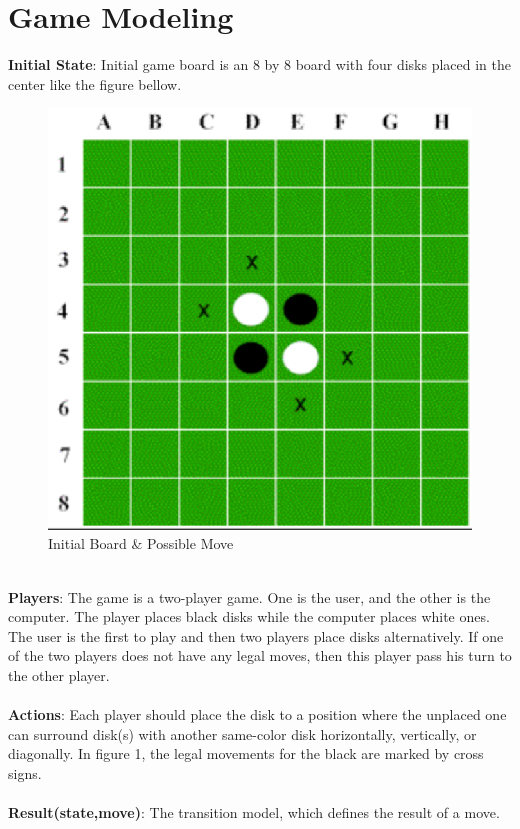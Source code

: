 \documentclass[letterpaper,12pt]{article}
\begin{document}
\section{Game Modeling}
\textbf{Initial State}: Initial game board is an 8 by 8 board with four disks placed in the center like the figure bellow.
\begin{figure}[!htb]
\centering
\includegraphics[scale=.6]{initial.eps}
\caption{Initial Board \& Possible Move}
\label{fig:digraph}
\end{figure}
\\
\noindent
\textbf{Players}: The game is a two-player game. One is the user, and the other is the computer. The player places black disks while the computer places white ones. The user is the first to play and then two players place disks alternatively. If one of the two players does not have any legal moves, then this player pass his turn to the other player.
\\\\
\textbf{Actions}: Each player should place the disk to a position where the unplaced one can surround disk(s) with another same-color disk horizontally, vertically, or diagonally. In figure 1, the legal movements for the black are marked by cross signs.
\\\\
\textbf{Result(state,move)}: The transition model, which defines the result of a move.
\end{document}
